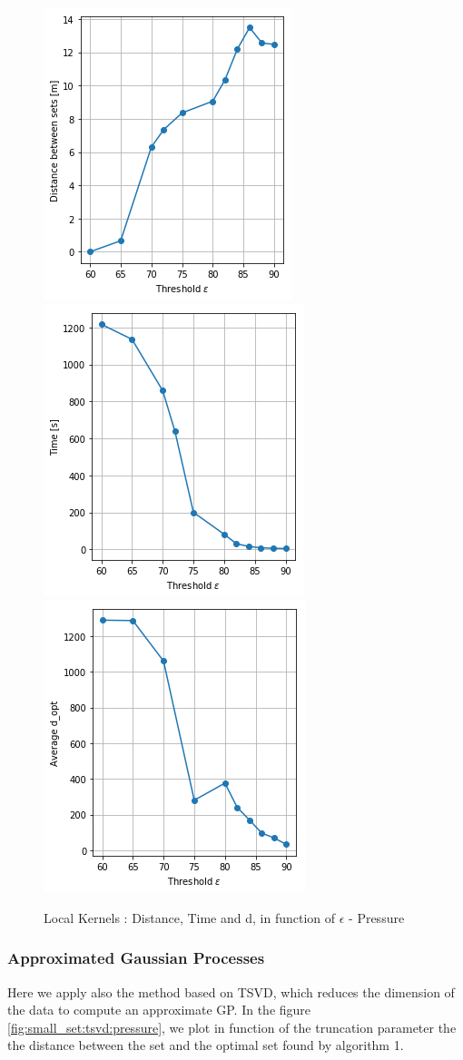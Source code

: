 \begin{figure}[h]
\centering
\includegraphics[height=0.33\linewidth]{figures/CompAlg/3rd/pressure_non_centered/comp_dist}
~
\includegraphics[height=0.33\linewidth]{figures/CompAlg/3rd/pressure_non_centered/comp_Time}
~
\includegraphics[height=0.33\linewidth]{figures/CompAlg/3rd/pressure_non_centered/comp_d_opt}
\caption{Local Kernels : Distance, Time and d, in function of $\epsilon$ - Pressure}
\label{fig:comp:results:pressure}
\end{figure}





\subsubsection{Approximated Gaussian Processes}

Here we apply also the method based on TSVD, which reduces the dimension of the data to compute an approximate GP. In the figure \ref{fig:small_set:tsvd:pressure}, we plot in function of the truncation parameter the the distance between the set and the optimal set found by algorithm 1.



